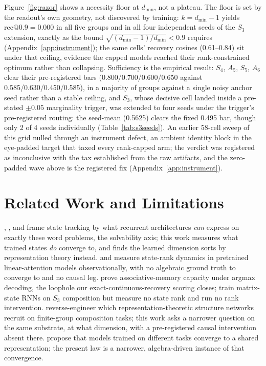 \documentclass{article}
\makeatletter
\newcommand{\dmin}{d_{\min}}
\newcommand{\recninety}{\mathrm{rec}@0.9}
\makeatother
\begin{document}
Figure~\ref{fig:razor} shows a necessity floor at $\dmin$, not a
plateau. The floor is set by the readout's own geometry, not discovered
by training: $k = \dmin{-}1$ yields $\recninety = 0.000$ in all five
groups
and in all four independent seeds of the $S_3$ extension,
exactly as the bound $\sqrt{(\dmin{-}1)/\dmin} < 0.9$ requires
(Appendix~\ref{app:instrument}); the same cells' recovery cosines
(0.61--0.84) sit under that ceiling, evidence the capped models reached
their rank-constrained optimum rather than collapsing.
Sufficiency is
the empirical result: $S_4$, $A_5$, $S_5$, $A_6$ clear their
pre-registered bars (0.800/0.700/0.600/0.650 against
0.585/0.630/0.450/0.585),
in a majority of groups against a single noisy anchor seed rather than a
stable ceiling, and $S_3$, whose decisive cell landed inside a
pre-stated $\pm 0.05$ marginality trigger, was extended to four seeds
under the trigger's pre-registered routing: the seed-mean (0.5625)
clears the fixed 0.495 bar, though only 2 of 4 seeds individually
(Table~\ref{tab:s3seeds}).
An earlier 58-cell sweep of this grid nulled through an instrument
defect, an ambient identity block in the eye-padded target that taxed
every rank-capped arm;
the verdict was registered as inconclusive with
the tax established from the raw artifacts, and the zero-padded wave
above is the registered fix (Appendix~\ref{app:instrument}).

\section{Related Work and Limitations}
\label{sec:related}

\citet{merrill2024illusion}, \citet{grazzi2025negative}, and
\citet{siems2025deltaproduct} frame state tracking by what recurrent
architectures \emph{can} express on exactly these word problems, the
solvability axis; this work measures what trained states \emph{do}
converge to, and finds the learned dimension sorts by representation
theory instead. \citet{nazari2026rank} and \citet{sun2026staterank}
measure state-rank dynamics in pretrained linear-attention models
observationally, with no algebraic ground truth to converge to and no
causal leg. \citet{nichani2025factual} prove associative-memory capacity
under argmax decoding, the loophole our exact-continuous-recovery
scoring closes; \citet{mishra2026m2rnn} train matrix-state RNNs on $S_3$
composition but measure no state rank and run no rank intervention.
\citet{chughtai2023toy} reverse-engineer which representation-theoretic
structure networks recruit on finite-group composition tasks; this work
asks a narrower question on the same substrate, at what dimension, with
a pre-registered causal intervention absent there.
\citet{huh2024platonic} propose that models trained on different tasks
converge to a shared representation; the present law is a narrower,
algebra-driven instance of that convergence.
\end{document}
